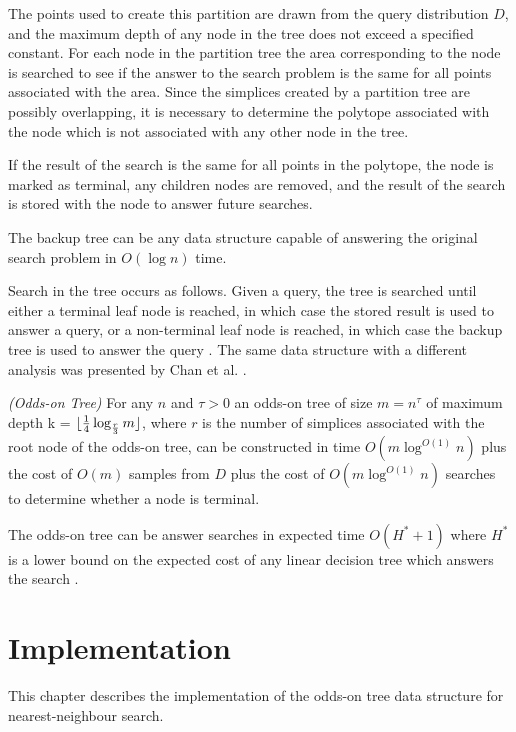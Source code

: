 \documentclass[mcs]{scsthesis}
\begin{document}
The points used to create this partition are drawn from the query distribution
\(D\), and the maximum depth of any node in the tree does not exceed a specified
constant. For each node in the partition tree the area corresponding to the node
is searched to see if the answer to the search problem is the same for all points
associated with the area. Since the simplices created by a partition tree are
possibly overlapping, it is necessary to determine the polytope associated with
the node which is not associated with any other node in the tree.

If the result of the search is the same for all points in the polytope, the node
is marked as terminal, any children nodes are removed, and the result of the
search is stored with the node to answer future searches.

The backup tree can be any data structure capable of answering the original
search problem in \(O(\log n)\) time.

Search in the tree occurs as follows. Given a query, the tree is searched until
either a terminal leaf node is reached, in which case the stored result is used
to answer a query, or a non-terminal leaf node is reached, in which case the
backup tree is used to answer the query \cite{oddson}. The same data structure
with a different analysis was presented by Chan et al. \cite{chan}.

\begin{thm} \emph{(Odds-on Tree)}
For any \(n\) and \(\tau>0\) an odds-on tree of size \(m = n^\tau\) of maximum
depth k = \(\lfloor {1 \over 4} \log_{r \over 3} m \rfloor \), where \(r\) is
the number of simplices associated with the root node of the odds-on tree, can
be constructed in time \(O(m \log^{O(1)} n)\) plus the cost of \(O(m)\) samples
from \(D\) plus the cost of \(O(m \log^{O(1)} n)\) searches to determine whether
a node is terminal.

The odds-on tree can be answer searches in expected time \(O(H^* + 1)\) where
\(H^*\) is a lower bound on the expected cost of any linear decision tree
which answers the search \cite{oddson}.  
\end{thm}

\chapter{Implementation}

This chapter describes the implementation of the odds-on tree data structure
for nearest-neighbour search.
\end{document}
